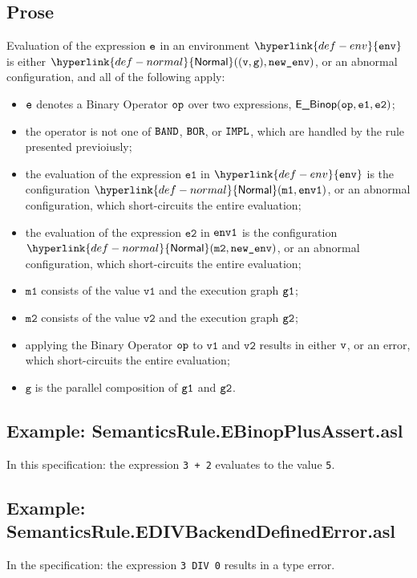 \documentclass{book}
\newcommand\ProseOrAbnormal[0]{or an abnormal configuration, which short-circuits the entire evaluation}
\newcommand\Normal[0]{\hyperlink{def-normal}{\textsf{Normal}}}
\newcommand\env[0]{\hyperlink{def-env}{\texttt{env}}}
\newcommand\vg[0]{\texttt{g}}
\newcommand\vvone[0]{\texttt{v1}}
\newcommand\vvtwo[0]{\texttt{v2}}
\newcommand\vmone[0]{\texttt{m1}}
\newcommand\vmtwo[0]{\texttt{m2}}
\newcommand\veone[0]{\texttt{e1}}
\newcommand\vetwo[0]{\texttt{e2}}
\begin{document}
  \subsection{Prose}
  Evaluation of the expression $\texttt{e}$ in an environment $\env$ is either $\Normal((\vv, \vg), \newenv)$,
  or an abnormal configuration, and all of the following apply:
  \begin{itemize}
    \item $\texttt{e}$ denotes a Binary Operator $\texttt{op}$ over two expressions, $\EBinop(\op, \veone, \vetwo)$;
    \item the operator is not one of $\texttt{BAND}$, $\texttt{BOR}$, or $\texttt{IMPL}$, which are handled by the
    rule presented previoiusly;
    \item the evaluation of the expression $\veone$ in $\env$ is the configuration $\Normal(\vmone, \envone)$,
    \ProseOrAbnormal;
    \item the evaluation of the expression $\vetwo$ in $\texttt{env1}$ is the configuration \\ $\Normal(\vmtwo, \newenv)$,
    \ProseOrAbnormal;
    \item $\vmone$ consists of the value $\vvone$ and the execution graph $\texttt{g1}$;
    \item $\vmtwo$ consists of the value $\vvtwo$ and the execution graph $\texttt{g2}$;
    \item applying the Binary Operator $\texttt{op}$ to $\vvone$ and $\vvtwo$ results in either $\texttt{v}$,
    or an error, which short-circuits the entire evaluation;
    \item $\vg$ is the parallel composition of $\texttt{g1}$ and $\texttt{g2}$.
  \end{itemize}

  \subsection{Example: SemanticsRule.EBinopPlusAssert.asl}
    In this specification:
    the expression \texttt{3 + 2} evaluates to the value \texttt{5}.

  \subsection{Example: \\ SemanticsRule.EDIVBackendDefinedError.asl}
    In the specification:
    the expression \texttt{3 DIV 0} results in a type error.
\end{document}
